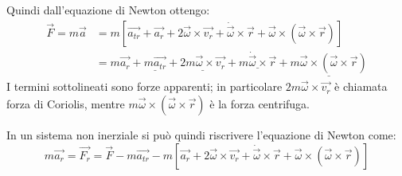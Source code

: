 \documentclass[main.tex]{subfiles}
\begin{document}
Quindi dall'equazione di Newton ottengo:
\begin{equation*}
\begin{split}
	\overrightarrow{F}=m\overrightarrow{a}	& =m\left[\overrightarrow{a_{tr}}+\overrightarrow{a_r}+2\overrightarrow{\omega}\times\overrightarrow{v_r}+\dot{\overrightarrow{\omega}}\times\overrightarrow{r}+\overrightarrow{\omega}\times(\overrightarrow{\omega}\times\overrightarrow{r})\right]\\
											& =m\overrightarrow{a_r}+\underline{m\overrightarrow{a_{tr}}}+\underline{2m\overrightarrow{\omega}\times\overrightarrow{v_r}}+\underline{m\dot{\overrightarrow{\omega}}\times\overrightarrow{r}}+\underline{m\overrightarrow{\omega}\times(\overrightarrow{\omega}\times\overrightarrow{r})}
\end{split}
\end{equation*}
I termini sottolineati sono forze apparenti; in particolare $2m\overrightarrow{\omega}\times\overrightarrow{v_r}$
è chiamata forza di Coriolis, mentre $m\overrightarrow{\omega}\times(\overrightarrow{\omega}\times\overrightarrow{r})$
è la forza centrifuga.

In un sistema non inerziale si può quindi riscrivere l'equazione di Newton come:
\begin{equation}\label{ForzaNonInerziale}
	m\overrightarrow{a_r}=\overrightarrow{F_r}=\overrightarrow{F}-m\overrightarrow{a_{tr}}-m\left[\overrightarrow{a_r}+2\overrightarrow{\omega}\times\overrightarrow{v_r}+\dot{\overrightarrow{\omega}}\times\overrightarrow{r}+\overrightarrow{\omega}\times(\overrightarrow{\omega}\times\overrightarrow{r})\right]
\end{equation}
\end{document}
